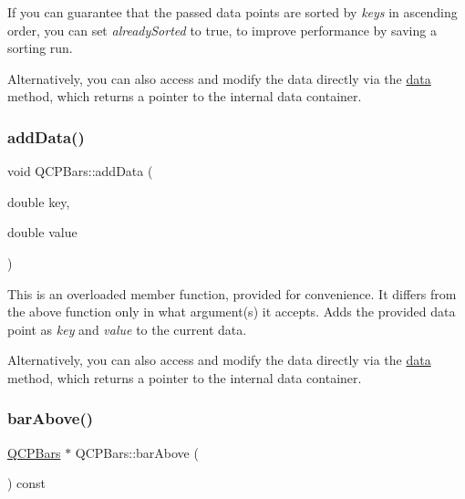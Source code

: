 If you can guarantee that the passed data points are sorted by {\itshape keys} in ascending order, you can set {\itshape already\+Sorted} to true, to improve performance by saving a sorting run.

Alternatively, you can also access and modify the data directly via the \mbox{\hyperlink{class_q_c_p_bars_a7e373a534d82e18ed27b3fafd1f08fae}{data}} method, which returns a pointer to the internal data container. \mbox{\label{class_q_c_p_bars_a684dd105403a5497fda42f2094fecbb7}} 
\subsubsection{\texorpdfstring{add\+Data()}{addData()}\hspace{0.1cm}{\footnotesize\ttfamily [2/2]}}
{\footnotesize\ttfamily void Q\+C\+P\+Bars\+::add\+Data (\begin{DoxyParamCaption}\item[{double}]{key,  }\item[{double}]{value }\end{DoxyParamCaption})}

This is an overloaded member function, provided for convenience. It differs from the above function only in what argument(s) it accepts. Adds the provided data point as {\itshape key} and {\itshape value} to the current data.

Alternatively, you can also access and modify the data directly via the \mbox{\hyperlink{class_q_c_p_bars_a7e373a534d82e18ed27b3fafd1f08fae}{data}} method, which returns a pointer to the internal data container. \mbox{\label{class_q_c_p_bars_ab97f2acd9f6cb40d2cc3c33d278f0e78}} 
\subsubsection{\texorpdfstring{bar\+Above()}{barAbove()}}
{\footnotesize\ttfamily \mbox{\hyperlink{class_q_c_p_bars}{Q\+C\+P\+Bars}} $\ast$ Q\+C\+P\+Bars\+::bar\+Above (\begin{DoxyParamCaption}{ }\end{DoxyParamCaption}) const\hspace{0.3cm}{\ttfamily [inline]}}

